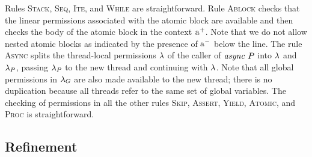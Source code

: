 Rules \textsc{Stack}, \textsc{Seq}, \textsc{Ite}, and \textsc{While} are straightforward.
Rule \textsc{Ablock} checks that the linear permissions associated with the atomic block are available
and then checks the body of the atomic block in the context $\mathrm{a^+}$.
Note that we do not allow nested atomic blocks as indicated by the presence of $\mathrm{a^-}$ below the line.
The rule \textsc{Async} splits the thread-local permissions $\lambda$ of the caller of $\mathit{async}\ P$ into $\lambda$ 
and $\lambda_P$, passing $\lambda_P$ to the new thread and continuing with $\lambda$.
Note that all global permissions in $\lambda_G$ are also made available to the new thread;
there is no duplication because all threads refer to the same set of global variables.
The checking of permissions in all the other rules \textsc{Skip}, \textsc{Assert}, \textsc{Yield}, \textsc{Atomic}, and \textsc{Proc}
is straightforward.

\subsection{Refinement}
\label{sec:refinement}

